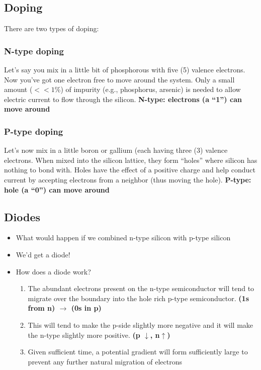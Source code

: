 \documentclass[11pt]{book}
\begin{document}
\subsection{Doping}
There are two types of doping:

\subsubsection{N-type doping}
Let’s say you mix in a little bit of phosphorous with five (5) valence electrons. Now you’ve got one electron free to move around the system. Only a small amount ($<<1$\%) of impurity (e.g., phosphorus, arsenic) is needed to allow electric current to flow through the silicon. \textbf{N-type: electrons (a ``1'') can move around}

\subsubsection{P-type doping}
Let's now mix in a little boron or gallium (each having three (3) valence electrons. When mixed into the silicon lattice, they form ``holes'' where silicon has nothing to bond with. Holes have the effect of a positive charge and help conduct current by accepting electrons from a neighbor (thus moving the hole). \textbf{P-type: hole (a ``0'') can move around}



\subsection{Diodes}
\begin{itemize}
	\item What would happen if we combined n-type silicon with p-type silicon 
	\item We'd get a diode! 
	\item How does a diode work?
	\begin{enumerate}
		\item The abundant electrons present on the n-type semiconductor will tend to migrate over the boundary into the hole rich p-type semiconductor. 
		\subitem \textbf{(1s from n) $\rightarrow$ (0s in p)}
		\item This will tend to make the p-side slightly more negative and it will make the n-type slightly more positive. 
		\subitem \textbf{(p $\downarrow$, n$\uparrow$)}
		\item Given sufficient time, a potential gradient will form sufficiently large to prevent any further natural migration of electrons 
	\end{enumerate}
\end{itemize}
\end{document}
